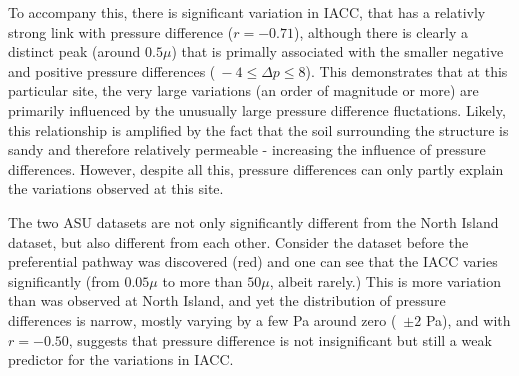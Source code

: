 \documentclass[journal=esthag,manuscript=article]{achemso}
\begin{document}
To accompany this, there is significant variation in IACC, that has a relativly strong link with pressure difference ($r = -0.71$), although there is clearly a distinct peak (around $0.5\mu$) that is primally associated with the smaller negative and positive pressure differences ($~-4 \leq \Delta p \leq 8$).
This demonstrates that at this particular site, the very large variations (an order of magnitude or more) are primarily influenced by the unusually large pressure difference fluctations.
Likely, this relationship is amplified by the fact that the soil surrounding the structure is sandy and therefore relatively permeable - increasing the influence of pressure differences.
However, despite all this, pressure differences can only partly explain the variations observed at this site.\par
The two ASU datasets are not only significantly different from the North Island dataset, but also different from each other.
Consider the dataset before the preferential pathway was discovered (red) and one can see that the IACC varies significantly (from $0.05 \mu$ to more than $50 \mu$, albeit rarely.)
This is more variation than was observed at North Island, and yet the distribution of pressure differences is narrow, mostly varying by a few Pa around zero (~$\pm 2$ Pa), and with $r = -0.50$, suggests that pressure difference is not insignificant but still a weak predictor for the variations in IACC.\par
\end{document}
